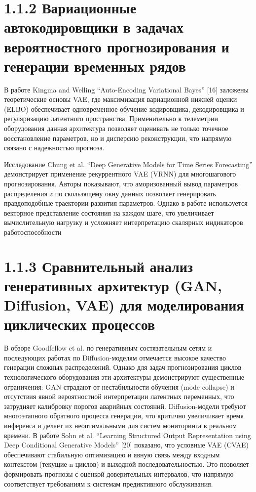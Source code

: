 \documentclass[14pt, a4paper, oneside]{extreport}
\begin{document}
\vspace{1em}
\section{1.1.2 Вариационные автокодировщики в задачах вероятностного прогнозирования и генерации временных рядов}
\vspace{1em}
В работе Kingma and Welling “Auto-Encoding Variational Bayes” [16] заложены теоретические основы VAE, где максимизация вариационной нижней оценки (ELBO) обеспечивает одновременное обучение кодировщика, декодировщика и регуляризацию латентного пространства. Применительно к телеметрии оборудования данная архитектура позволяет оценивать не только точечное восстановление параметров, но и дисперсию реконструкции, что напрямую связано с надежностью прогноза.

Исследование Chung et al. “Deep Generative Models for Time Series Forecasting” демонстрирует применение рекуррентного VAE (VRNN) для многошагового прогнозирования. Авторы показывают, что аморизованный вывод параметров распределения $z$ по скользящему окну данных позволяет генерировать правдоподобные траектории развития параметров. Однако в работе используется векторное представление состояния на каждом шаге, что увеличивает вычислительную нагрузку и усложняет интерпретацию скалярных индикаторов работоспособности

\vspace{1em}
\section{1.1.3 Сравнительный анализ генеративных архитектур (GAN, Diffusion, VAE) для моделирования циклических процессов}
\vspace{1em}
В обзоре Goodfellow et al. по генеративным состязательным сетям и последующих работах по Diffusion-моделям отмечается высокое качество генерации сложных распределений. Однако для задач прогнозирования циклов технологического оборудования эти архитектуры демонстрируют существенные ограничения: GAN страдают от нестабильности обучения (mode collapse) и отсутствия явной вероятностной интерпретации латентных переменных, что затрудняет калибровку порогов аварийных состояний. Diffusion-модели требуют многоэтапного обратного процесса генерации, что критично увеличивает время инференса и делает их неоптимальными для систем мониторинга в реальном времени.
В работе Sohn et al. “Learning Structured Output Representation using Deep Conditional Generative Models” [20] показано, что условные VAE (CVAE) обеспечивают стабильную оптимизацию и явную связь между входным контекстом (текущие n циклов) и выходной последовательностью. Это позволяет формировать прогнозы с оценкой доверительных интервалов, что напрямую соответствует требованиям к системам предиктивного обслуживания.
\end{document}
